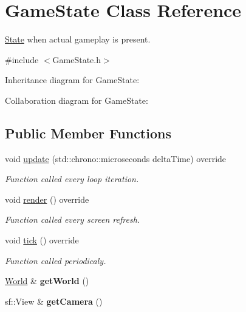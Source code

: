 \hypertarget{classGameState}{\section{Game\-State Class Reference}
\label{classGameState}
}


\hyperlink{classState}{State} when actual gameplay is present.  




{\ttfamily \#include $<$Game\-State.\-h$>$}



Inheritance diagram for Game\-State\-:


Collaboration diagram for Game\-State\-:
\subsection*{Public Member Functions}
\begin{DoxyCompactItemize}
\item 
void \hyperlink{classGameState_aba059d7ab1a53b8f5d795292ed37abac}{update} (std\-::chrono\-::microseconds delta\-Time) override
\begin{DoxyCompactList}\small\item\em Function called every loop iteration. \end{DoxyCompactList}\item 
void \hyperlink{classGameState_a2c36ada0cae89f91d956e2c91b070893}{render} () override
\begin{DoxyCompactList}\small\item\em Function called every screen refresh. \end{DoxyCompactList}\item 
void \hyperlink{classGameState_ae9ff24d75f36ef56daa6a180d4b38a09}{tick} () override
\begin{DoxyCompactList}\small\item\em Function called periodicaly. \end{DoxyCompactList}\item 
\hypertarget{classGameState_aebc076f9bcec0aa4317eff9e9a8d566e}{\hyperlink{classWorld}{World} \& {\bfseries get\-World} ()}\label{classGameState_aebc076f9bcec0aa4317eff9e9a8d566e}

\item 
\hypertarget{classGameState_a45607b8a0473073090740500826268c0}{sf\-::\-View \& {\bfseries get\-Camera} ()}\label{classGameState_a45607b8a0473073090740500826268c0}

\end{DoxyCompactItemize}


